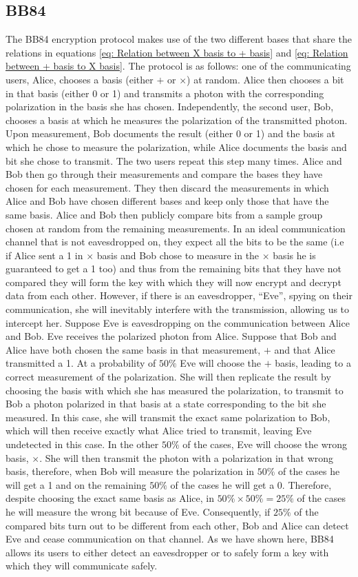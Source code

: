 \documentclass[reprint,amsmath,amssymb,aps, prl,superscriptaddress]{revtex4-2}
\begin{document}
\subsection*{BB84}
The BB84 encryption protocol makes use of the two different bases that share the relations in equations \ref{eq: Relation between X basis to + basis} and \ref{eq: Relation between + basis to X basis}. The protocol is as follows: one of the communicating users, Alice, chooses a basis (either $+$ or $\times$) at random. Alice then chooses a bit in that basis (either 0 or 1) and transmits a photon with the corresponding polarization in the basis she has chosen. Independently, the second user, Bob, chooses a basis at which he measures the polarization of the transmitted photon. Upon measurement, Bob documents the result (either 0 or 1) and the basis at which he chose to measure the polarization, while Alice documents the basis and bit she chose to transmit. The two users repeat this step many times. Alice and Bob then go through their measurements and compare the bases they have chosen for each measurement. They then discard the measurements in which Alice and Bob have chosen different bases and keep only those that have the same basis. Alice and Bob then publicly compare bits from a sample group chosen at random from the remaining measurements. In an ideal communication channel that is not eavesdropped on, they expect all the bits to be the same (i.e if Alice sent a 1 in $\times$ basis and Bob chose to measure in the $\times$ basis he is guaranteed to get a 1 too) and thus from the remaining bits that they have not compared they will form the key with which they will now encrypt and decrypt data from each other. However, if there is an eavesdropper, ``Eve'', spying on their communication, she will inevitably interfere with the transmission, allowing us to intercept her.  Suppose Eve is eavesdropping on the communication between Alice and Bob. Eve receives the polarized photon from Alice. Suppose that Bob and Alice have both chosen the same basis in that measurement, $+$ and that Alice transmitted a 1. At a probability of $50\%$ Eve will choose the $+$ basis, leading to a correct measurement of the polarization. She will then replicate the result by choosing the basis with which she has measured the polarization, to transmit to Bob a photon polarized in that basis at a state corresponding to the bit she measured. In this case, she will transmit the exact same polarization to Bob, which will then receive exactly what Alice tried to transmit, leaving Eve undetected in this case. In the other $50\%$ of the cases, Eve will choose the wrong basis, $\times$. She will then transmit the photon with a polarization in that wrong basis, therefore, when Bob will measure the polarization in $50\%$ of the cases he will get a 1 and on the remaining $50\%$ of the cases he will get a 0. Therefore, despite choosing the exact same basis as Alice, in $50\%\times50\%=25\%$ of the cases he will measure the wrong bit because of Eve. Consequently, if $25\%$ of the compared bits turn out to be different from each other, Bob and Alice can detect Eve and cease communication on that channel. As we have shown here, BB84 allows its users to either detect an eavesdropper or to safely form a key with which they will communicate safely.
\end{document}
